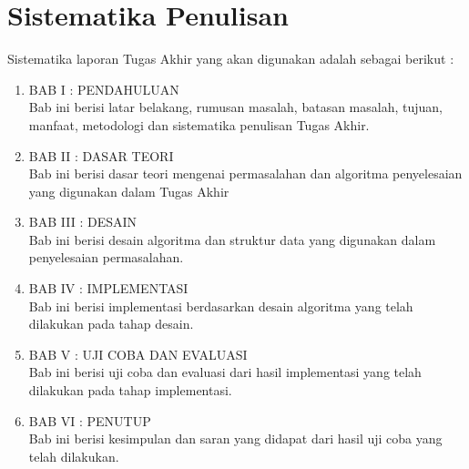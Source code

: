 \section {Sistematika Penulisan}
Sistematika laporan Tugas Akhir yang akan digunakan adalah sebagai berikut :
\begin{enumerate}
    \item BAB I : PENDAHULUAN\\
    Bab ini berisi latar belakang, rumusan masalah, batasan masalah, tujuan, manfaat, metodologi dan sistematika penulisan Tugas Akhir.
    \item BAB II : DASAR TEORI\\
    Bab ini berisi dasar teori mengenai permasalahan dan algoritma penyelesaian yang digunakan dalam Tugas Akhir
    \item BAB III : DESAIN\\
    Bab ini berisi desain algoritma dan struktur data yang digunakan dalam penyelesaian permasalahan.
    \item BAB IV : IMPLEMENTASI\\
    Bab ini berisi implementasi berdasarkan desain algoritma yang telah dilakukan pada tahap desain.
    \item BAB V : UJI COBA DAN EVALUASI\\
    Bab ini berisi uji coba dan evaluasi dari hasil implementasi yang telah dilakukan pada tahap implementasi.
    \item BAB VI : PENUTUP\\
    Bab ini berisi kesimpulan dan saran yang didapat dari hasil uji coba yang telah dilakukan.
\end{enumerate}